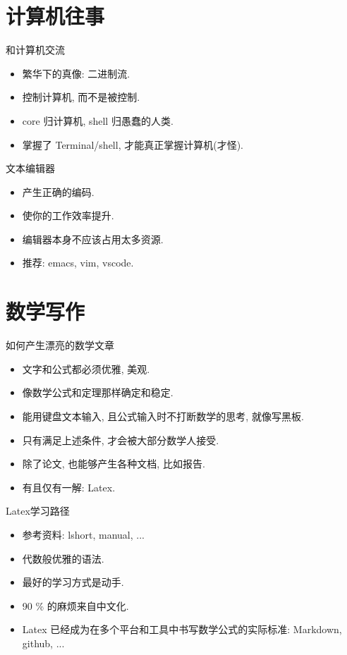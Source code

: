 \documentclass{beamer}
\begin{document}
\section{计算机往事}

\begin{frame}{和计算机交流}
  \begin{itemize}
  \item<1-> 繁华下的真像: 二进制流. 
  \item<2-> 控制计算机, 而不是被控制.
  \item<3-> core 归计算机, shell 归愚蠢的人类.
  \item<4-> 掌握了 Terminal/shell, 才能真正掌握计算机(才怪).
  \end{itemize}
\end{frame}

\begin{frame}{文本编辑器}
  \begin{itemize}
  \item<1-> 产生正确的编码.
  \item<2-> 使你的工作效率提升.
  \item<3-> 编辑器本身不应该占用太多资源.
  \item<4-> 推荐: emacs, vim, vscode.
  \end{itemize}
\end{frame}

\section{数学写作}
\begin{frame}{如何产生漂亮的数学文章}
  \begin{itemize}
  \item<1-> 文字和公式都必须优雅, 美观.
  \item<2-> 像数学公式和定理那样确定和稳定.
  \item<3-> 能用键盘文本输入, 且公式输入时不打断数学的思考, 就像写黑板.
  \item<4-> 只有满足上述条件, 才会被大部分数学人接受.
  \item<5-> 除了论文, 也能够产生各种文档, 比如报告.
  \item<6-> 有且仅有一解: Latex.
  \end{itemize}
\end{frame}

\begin{frame}{Latex学习路径}
  \begin{itemize}
  \item<1-> 参考资料: lshort, manual, ...
  \item<2-> 代数般优雅的语法.
  \item<3-> 最好的学习方式是动手. 
  \item<4-> 90 \% 的麻烦来自中文化.
  \item<5-> Latex 已经成为在多个平台和工具中书写数学公式的实际标准: Markdown, github, ...
  \end{itemize}
\end{frame}
\end{document}
